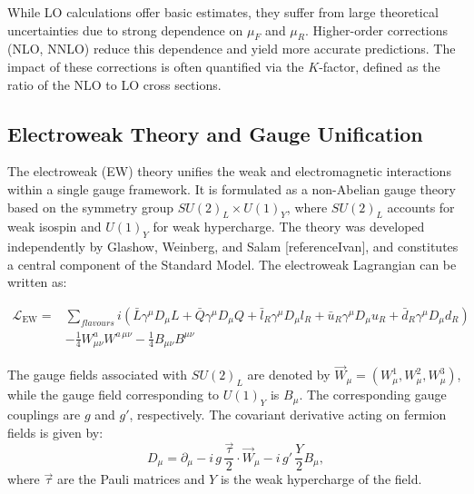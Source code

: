\documentclass[11pt,twoside]{book}
\begin{document}
While LO calculations offer basic estimates, they suffer from large theoretical uncertainties due to strong dependence on $\mu_F$ and $\mu_R$. Higher-order corrections (NLO, NNLO) reduce this dependence and yield more accurate predictions. The impact of these corrections is often quantified via the $K$-factor, defined as the ratio of the NLO to LO cross sections.

\subsection{Electroweak Theory and Gauge Unification}
\label{subsec:ew_theory}

The electroweak (EW) theory unifies the weak and electromagnetic interactions within a single gauge framework. It is formulated as a non-Abelian gauge theory based on the symmetry group $SU(2)_L \times U(1)_Y$, where $SU(2)_L$ accounts for weak isospin and $U(1)_Y$ for weak hypercharge. The theory was developed independently by Glashow, Weinberg, and Salam [referenceIvan], and constitutes a central component of the Standard Model. The electroweak Lagrangian can be written as:

\begin{equation}
\begin{split}
\mathcal{L}_{\text{EW}} = 
&\sum_{flavours} i(\bar{L}\gamma^\mu D_\mu L +\bar{Q}\gamma^\mu D_\mu Q + \bar{l}_{R}\gamma^\mu D_\mu l_{R} + \bar{u}_{R}\gamma^\mu D_\mu u_{R} + \bar{d}_{R}\gamma^\mu D_\mu d_{R}) \\
&- \frac{1}{4} W_{\mu\nu}^a W^{a\,\mu\nu} - \frac{1}{4} B_{\mu\nu} B^{\mu\nu}
\end{split}
\label{eq:ew_lagrangian}
\end{equation}

The gauge fields associated with $SU(2)_L$ are denoted by $\vec{W}_\mu = (W_\mu^1, W_\mu^2, W_\mu^3)$, while the gauge field corresponding to $U(1)_Y$ is $B_\mu$. The corresponding gauge couplings are $g$ and $g'$, respectively. The covariant derivative acting on fermion fields is given by:
\begin{equation}
D_\mu = \partial_\mu - i \, g \, \frac{\vec{\tau}}{2} \cdot \vec{W}_\mu - i \, g' \, \frac{Y}{2} B_\mu,
\end{equation}
where $\vec{\tau}$ are the Pauli matrices and $Y$ is the weak hypercharge of the field.
\end{document}
